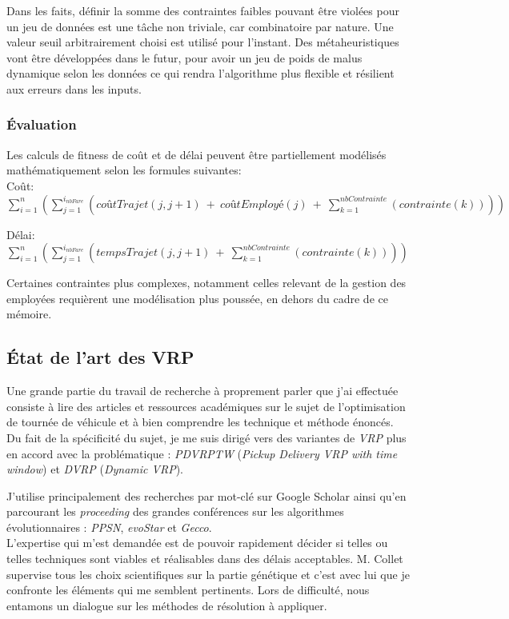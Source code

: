 \documentclass[french, 11pt]{memoir}
\begin{document}
\bigskip
Dans les faits, définir la somme des contraintes faibles pouvant être
violées pour un jeu de données est une tâche non triviale, car
combinatoire par nature. Une valeur seuil arbitrairement choisi est
utilisé pour l'instant. Des métaheuristiques vont être développées dans
le futur, pour avoir un jeu de poids de malus dynamique selon les
données ce qui rendra l'algorithme plus flexible et résilient aux
erreurs dans les inputs.

\subsubsection{Évaluation}\label{uxe9valuation-1}

Les calculs de fitness de coût et de délai peuvent être partiellement
modélisés mathématiquement selon les formules suivantes:\\

Coût: $\sum_{i=1}^{n}(\sum_{j=1}^{i_{nbFare}} (coûtTrajet(j, j+1)\ +\ coûtEmployé(j)\ +\ \sum_{k=1}^{nbContrainte}(contrainte(k))))$

\bigskip
Délai: $\sum_{i=1}^{n}(\sum_{j=1}^{i_{nbFare}} (tempsTrajet(j, j+1)\ +\ \sum_{k=1}^{nbContrainte}(contrainte(k))))$

\bigskip

Certaines contraintes plus complexes, notamment celles relevant de la
gestion des employées requièrent une modélisation plus poussée, en
dehors du cadre de ce mémoire.

\subsection{État de l'art des VRP}\label{uxe9tat-de-lart-des-vrp}

Une grande partie du travail de recherche à proprement parler que j'ai
effectuée consiste à lire des articles et ressources académiques sur le
sujet de l'optimisation de tournée de véhicule et à bien comprendre les
technique et méthode énoncés. Du fait de la spécificité du sujet, je me
suis dirigé vers des variantes de \textit{VRP} plus en accord avec la
problématique : \emph{PDVRPTW} (\emph{Pickup Delivery VRP with time
window}) et \emph{DVRP} (\emph{Dynamic VRP}). 

\bigskip
J'utilise principalement des recherches par mot-clé sur Google Scholar
ainsi qu'en parcourant les \emph{proceeding} des grandes conférences sur
les algorithmes évolutionnaires : \emph{PPSN}, \emph{evoStar} et
\emph{Gecco}. \\
L'expertise qui m'est demandée est de pouvoir rapidement
décider si telles ou telles techniques sont viables et réalisables dans
des délais acceptables. M. Collet supervise tous les choix scientifiques
sur la partie génétique et c'est avec lui que je confronte les éléments
qui me semblent pertinents. Lors de difficulté, nous entamons un
dialogue sur les méthodes de résolution à appliquer.
\end{document}

